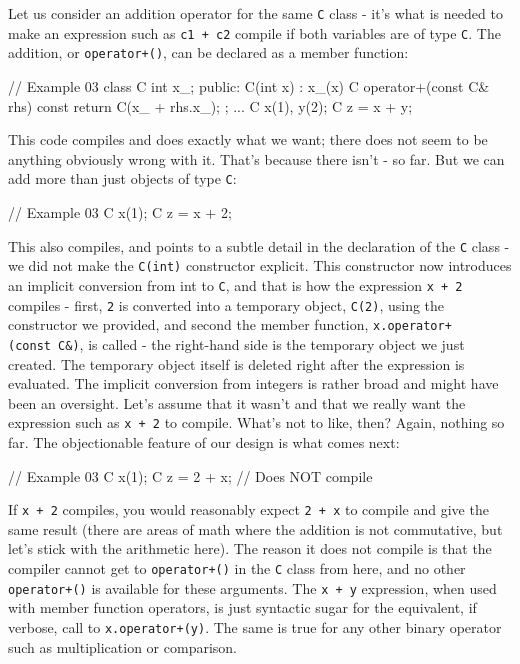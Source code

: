 Let us consider an addition operator for the same \texttt{C} class - it's what is needed to make an expression such as \texttt{c1\ +\ c2} compile if both variables are of type \texttt{C}. The addition, or \texttt{operator+()}, can be declared as a member function:

\begin{code}
// Example 03
class C {
  int x_;
  public:
  C(int x) : x_(x) {}
  C operator+(const C& rhs) const {
    return C(x_ + rhs.x_);
  }
};
...
C x(1), y(2);
C z = x + y;
\end{code}

This code compiles and does exactly what we want; there does not seem to be anything obviously wrong with it. That's because there isn't - so far. But we can add more than just objects of type \texttt{C}:

\begin{code}
// Example 03
C x(1);
C z = x + 2;
\end{code}

This also compiles, and points to a subtle detail in the declaration of the \texttt{C} class - we did not make the \texttt{C(int)} constructor explicit. This constructor now introduces an implicit conversion from int to \texttt{C}, and that is how the expression \texttt{x\ +\ 2} compiles - first, \texttt{2} is converted into a temporary object, \texttt{C(2)}, using the constructor we provided, and second the member function, \texttt{x.operator+(const\ C\&)}, is called - the right-hand side is the temporary object we just created. The temporary object itself is deleted right after the expression is evaluated. The implicit conversion from integers is rather broad and might have been an oversight. Let's assume that it wasn't and that we really want the expression such as \texttt{x\ +\ 2} to compile. What's not to like, then? Again, nothing so far. The objectionable feature of our design is what comes next:

\begin{code}
// Example 03
C x(1);
C z = 2 + x; // Does NOT compile
\end{code}

If \texttt{x\ +\ 2} compiles, you would reasonably expect \texttt{2\ +\ x} to compile and give the same result (there are areas of math where the addition is not commutative, but let's stick with the arithmetic here). The reason it does not compile is that the compiler cannot get to \texttt{operator+()} in the \texttt{C} class from here, and no other \texttt{operator+()} is available for these arguments. The \texttt{x\ +\ y} expression, when used with member function operators, is just syntactic sugar for the equivalent, if verbose, call to \texttt{x.operator+(y)}. The same is true for any other binary operator such as multiplication or comparison.

